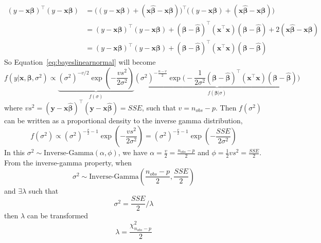 \begin{align} 
    (y-\mathbf{x}\boldsymbol{\beta})^{\top}(y-\mathbf{x}\boldsymbol{\beta})&=\big ((y-\mathbf{x}\boldsymbol{\beta})+(\mathbf{x}\hat{\boldsymbol{\beta}}-\mathbf{x}\boldsymbol{\beta})\big )^{\top}\big ((y-\mathbf{x}\boldsymbol{\beta})+(\mathbf{x}\hat{\boldsymbol{\beta}}-\mathbf{x}\boldsymbol{\beta})\big )\\
    &=(y-\mathbf{x}\boldsymbol{\beta})^{\top}(y-\mathbf{x}\boldsymbol{\beta}) + (\boldsymbol{\beta}-\hat{\boldsymbol{\beta}})^{\top}(\mathbf{x}^{\top}\mathbf{x})(\boldsymbol{\beta}-\hat{\boldsymbol{\beta}})+2(\mathbf{x}\hat{\boldsymbol{\beta}}-\mathbf{x}\boldsymbol{\beta})\\
    &=(y-\mathbf{x}\boldsymbol{\beta})^{\top}(y-\mathbf{x}\boldsymbol{\beta}) + (\boldsymbol{\beta}-\hat{\boldsymbol{\beta}})^{\top}(\mathbf{x}^{\top}\mathbf{x})(\boldsymbol{\beta}-\hat{\boldsymbol{\beta}})
\end{align}
So Equation~\ref{eq:bayeslinearnormal} will become 
\begin{equation} 
    f(y|\mathbf{x}, \boldsymbol{\beta}, \sigma^2)\propto \underbrace{(\sigma^2)^{-v/2}\exp (-\frac{vs^2}{2\sigma^2})}_{f(\sigma)}\underbrace{(\sigma^2)^{-\frac{n-v}{2}}\exp \Big (-\frac{1}{2\sigma^2}(\boldsymbol{\beta}-\hat{\boldsymbol{\beta}})^{\top}(\mathbf{x}^{\top}\mathbf{x})(\boldsymbol{\beta}-\hat{\boldsymbol{\beta}})\Big )}_{f(\boldsymbol{\beta}|\sigma)}
\end{equation}
where $vs^2=(\mathbf{y}-\mathbf{x}\hat{\boldsymbol{\beta}})^{\top}(\mathbf{y}-\mathbf{x}\hat{\boldsymbol{\beta}})=SSE$, such that $v=n_{obs}-p$. 
Then $f(\sigma^2)$ can be written as a proportional density to the inverse gamma distribution,
\begin{equation} 
    f(\sigma^2)\propto (\sigma^2)^{-\frac{v}{2}-1}\exp (-\frac{vs^2}{2\sigma^2})=(\sigma^2)^{-\frac{v}{2}-1}\exp (-\frac{SSE}{2\sigma^2})
\end{equation}
In this $\sigma^2\sim \text{Inverse-Gamma}(\alpha, \phi)$, we have $\alpha = \frac{v}{2}=\frac{n_{obs}-p}{2}$ and $\phi = \frac{1}{2}vs^2=\frac{SSE}{2}$.
From the inverse-gamma property, when 
\begin{equation} 
    \sigma^2\sim \text{Inverse-Gamma}(\frac{n_{obs}-p}{2}, \frac{SSE}{2})
\end{equation}
and $\exists\lambda$ such that 
\begin{equation} 
    \sigma^2=\frac{SSE}{2}/\lambda
\end{equation}
then $\lambda$ can be transformed 
\begin{equation} 
    \lambda = \frac{\chi^2_{n_{obs}-p}}{2}
\end{equation}
